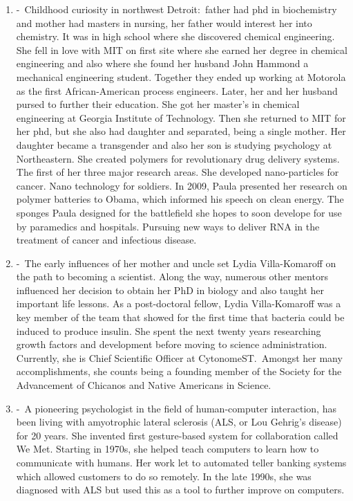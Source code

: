 \documentclass[12pt,a4paper]{article}
\begin{document}
\begin{enumerate}
    \item {} -\ Childhood curiosity in northwest Detroit:\ father had phd in biochemistry and mother had masters in nursing, her father would interest her into chemistry. It was in high school where she discovered chemical engineering. She fell in love with MIT on first site where she earned her degree in chemical engineering and also where she found her husband John Hammond a mechanical engineering student. Together they ended up working at Motorola as the first African-American process engineers. Later, her and her husband pursed to further their education. She got her master's in chemical engineering at Georgia Institute of Technology. Then she returned to MIT for her phd, but she also had daughter and separated, being a single mother. Her daughter became a transgender and also her son is studying psychology at Northeastern. She created polymers for revolutionary drug delivery systems. The first of her three major research areas. She developed nano-particles for cancer. Nano technology for soldiers. In 2009, Paula presented her research on polymer batteries to Obama, which informed his speech on clean energy. The sponges Paula designed for the battlefield she hopes to soon develope for use by paramedics and hospitals. Pursuing new ways to deliver RNA in the treatment of cancer and infectious disease.
    \item {} -\ The early influences of her mother and uncle set Lydia Villa-Komaroff on the path to becoming a scientist. Along the way, numerous other mentors influenced her decision to obtain her PhD in biology and also taught her important life lessons. As a post-doctoral fellow, Lydia Villa-Komaroff was a key member of the team that showed for the first time that bacteria could be induced to produce insulin. She spent the next twenty years researching growth factors and development before moving to science administration. Currently, she is Chief Scientific Officer at CytonomeST.\ Amongst her many accomplishments, she counts being a founding member of the Society for the Advancement of Chicanos and Native Americans in Science. 
    \item {} -\ A pioneering psychologist in the field of human-computer interaction, has been living with amyotrophic lateral sclerosis (ALS, or Lou Gehrig's disease) for 20 years. She invented first gesture-based system for collaboration called We Met. Starting in 1970s, she helped teach computers to learn how to communicate with humans. Her work let to automated teller banking systems which allowed customers to do so remotely. In the late 1990s, she was diagnosed with ALS but used this as a tool to further improve on computers. 

\end{enumerate}
\end{document}

